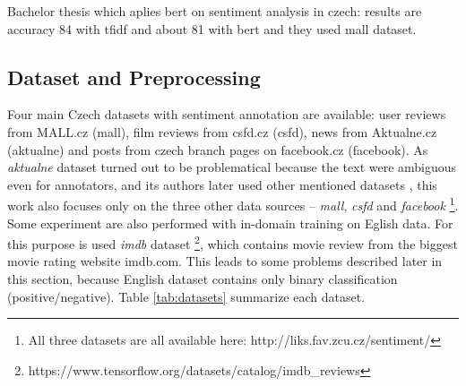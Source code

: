 Bachelor thesis which aplies bert on sentiment analysis in czech:
results are accuracy 84 with tfidf and about 81 with bert and they used mall dataset.

\subsection{Dataset and Preprocessing}
Four main Czech datasets with sentiment annotation are available: user reviews from MALL.cz (mall), film reviews from csfd.cz (csfd), news from Aktualne.cz (aktualne) and posts from czech branch pages on facebook.cz (facebook). As \textit{aktualne} dataset turned out to be problematical because the text were ambiguous even for annotators, and its authors later used other mentioned datasets \citep{Veselovska}, this work also focuses only on the three other data sources -- \textit{mall}, \textit{csfd} and \textit{facebook} \footnote{All three datasets are all available here: http://liks.fav.zcu.cz/sentiment/}. Some experiment are also performed with in-domain training on Eglish data. For this purpose is used \textit{imdb} dataset \footnote{https://www.tensorflow.org/datasets/catalog/imdb\_reviews}, which contains movie review from the biggest movie rating website imdb.com. This leads to some problems described later in this section, because English dataset contains only binary classification (positive/negative). Table \ref{tab:datasets} summarize each dataset.
